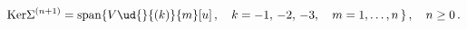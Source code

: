 \begin{equation*}
{\mathrm{Ker}} \Sigma^{(n+1)} = {\mathrm{span}}\{V\ud{}{(k)}{m}[u]\,,\quad
{k} = -1,\,-2,\,-3,\quad {m} = 1,\ldots,{n}\, \}\,,\quad {n} \geq 0 \,.
\end{equation*}

